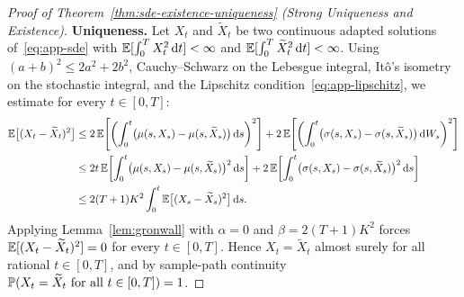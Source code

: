 \begin{proof}[Proof of Theorem~\ref{thm:sde-existence-uniqueness} (Strong Uniqueness and Existence)]
    \textbf{Uniqueness.} Let $X_t$ and $\widetilde{X}_t$ be two continuous adapted solutions of~\eqref{eq:app-sde} with $\mathbb{E}[\int_0^T X_t^2 \,\mathrm{d} t] < \infty$ and $\mathbb{E}[\int_0^T \widetilde{X}_t^2 \,\mathrm{d} t] < \infty$. Using $(a + b)^2 \leq 2a^2 + 2b^2$, Cauchy--Schwarz on the Lebesgue integral, It\^o's isometry on the stochastic integral, and the Lipschitz condition~\eqref{eq:app-lipschitz}, we estimate for every $t \in [0, T]$:
    \begin{align*}
        \mathbb{E}\bigl[(X_t - \widetilde{X}_t)^2\bigr]
        &\leq 2\,\mathbb{E}\!\left[\left(\int_0^t \bigl(\mu(s, X_s) - \mu(s, \widetilde{X}_s)\bigr)\,\mathrm{d} s\right)^2\right]
           + 2\,\mathbb{E}\!\left[\left(\int_0^t \bigl(\sigma(s, X_s) - \sigma(s, \widetilde{X}_s)\bigr)\,\mathrm{d} W_s\right)^2\right] \\
        &\leq 2t\,\mathbb{E}\!\left[\int_0^t \bigl(\mu(s, X_s) - \mu(s, \widetilde{X}_s)\bigr)^2 \,\mathrm{d} s\right]
           + 2\,\mathbb{E}\!\left[\int_0^t \bigl(\sigma(s, X_s) - \sigma(s, \widetilde{X}_s)\bigr)^2 \,\mathrm{d} s\right] \\
        &\leq 2(T + 1)K^2 \int_0^t \mathbb{E}\bigl[(X_s - \widetilde{X}_s)^2\bigr]\,\mathrm{d} s.
    \end{align*}
    Applying Lemma~\ref{lem:gronwall} with $\alpha = 0$ and $\beta = 2(T + 1)K^2$ forces $\mathbb{E}[(X_t - \widetilde{X}_t)^2] = 0$ for every $t \in [0, T]$. Hence $X_t = \widetilde{X}_t$ almost surely for all rational $t \in [0, T]$, and by sample-path continuity $\mathbb{P}(X_t = \widetilde{X}_t \text{ for all } t \in [0, T]) = 1$.


\end{proof}
